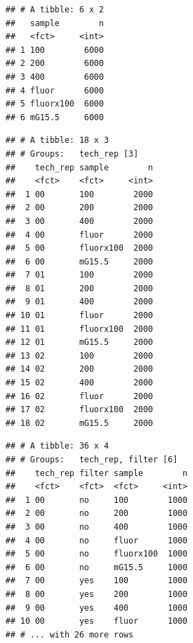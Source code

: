 \documentclass[10pt,letterpaper]{article}
\newenvironment{Shaded}{\begin{snugshade}}{\end{snugshade}}
\newcommand{\KeywordTok}[1]{\textcolor[rgb]{0.13,0.29,0.53}{\textbf{#1}}}
\newcommand{\StringTok}[1]{\textcolor[rgb]{0.31,0.60,0.02}{#1}}
\newcommand{\OperatorTok}[1]{\textcolor[rgb]{0.81,0.36,0.00}{\textbf{#1}}}
\newcommand{\NormalTok}[1]{#1}
\begin{document}
\begin{Shaded}
\end{Shaded}

\begin{verbatim}
## # A tibble: 6 x 2
##   sample        n
##   <fct>     <int>
## 1 100        6000
## 2 200        6000
## 3 400        6000
## 4 fluor      6000
## 5 fluorx100  6000
## 6 mG15.5     6000
\end{verbatim}

\begin{Shaded}
\end{Shaded}

\begin{verbatim}
## # A tibble: 18 x 3
## # Groups:   tech_rep [3]
##    tech_rep sample        n
##    <fct>    <fct>     <int>
##  1 00       100        2000
##  2 00       200        2000
##  3 00       400        2000
##  4 00       fluor      2000
##  5 00       fluorx100  2000
##  6 00       mG15.5     2000
##  7 01       100        2000
##  8 01       200        2000
##  9 01       400        2000
## 10 01       fluor      2000
## 11 01       fluorx100  2000
## 12 01       mG15.5     2000
## 13 02       100        2000
## 14 02       200        2000
## 15 02       400        2000
## 16 02       fluor      2000
## 17 02       fluorx100  2000
## 18 02       mG15.5     2000
\end{verbatim}

\begin{Shaded}
\end{Shaded}

\begin{verbatim}
## # A tibble: 36 x 4
## # Groups:   tech_rep, filter [6]
##    tech_rep filter sample        n
##    <fct>    <fct>  <fct>     <int>
##  1 00       no     100        1000
##  2 00       no     200        1000
##  3 00       no     400        1000
##  4 00       no     fluor      1000
##  5 00       no     fluorx100  1000
##  6 00       no     mG15.5     1000
##  7 00       yes    100        1000
##  8 00       yes    200        1000
##  9 00       yes    400        1000
## 10 00       yes    fluor      1000
## # ... with 26 more rows
\end{verbatim}
\end{document}
